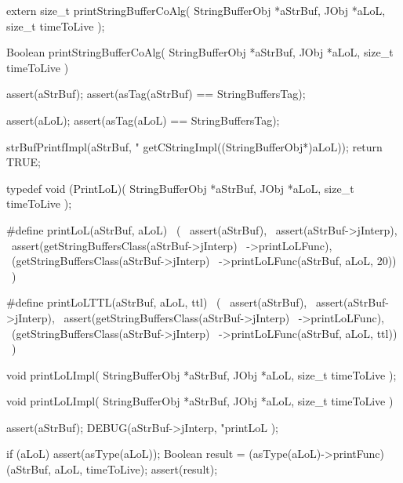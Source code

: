 
\startCHeader
extern size_t printStringBufferCoAlg(
  StringBufferObj *aStrBuf,
  JObj            *aLoL,
  size_t           timeToLive
);
\stopCHeader
{}

\startCCode
Boolean printStringBufferCoAlg(
  StringBufferObj *aStrBuf,
  JObj            *aLoL,
  size_t           timeToLive
) {
  assert(aStrBuf);
  assert(asTag(aStrBuf) == StringBuffersTag);
  
  assert(aLoL);
  assert(asTag(aLoL) == StringBuffersTag);

  strBufPrintfImpl(aStrBuf, "%
    getCStringImpl((StringBufferObj*)aLoL));
  return TRUE;
}
\stopCCode

\startCHeader
typedef void (PrintLoL)(
  StringBufferObj *aStrBuf,
  JObj            *aLoL,
  size_t           timeToLive
);

#define printLoL(aStrBuf, aLoL)                     \
  (                                                 \
    assert(aStrBuf),                                \
    assert(aStrBuf->jInterp),                       \
    assert(getStringBuffersClass(aStrBuf->jInterp)  \
      ->printLoLFunc),                              \
    (getStringBuffersClass(aStrBuf->jInterp)        \
      ->printLoLFunc(aStrBuf, aLoL, 20))            \
  )

#define printLoLTTL(aStrBuf, aLoL, ttl)             \
  (                                                 \
    assert(aStrBuf),                                \
    assert(aStrBuf->jInterp),                       \
    assert(getStringBuffersClass(aStrBuf->jInterp)  \
      ->printLoLFunc),                              \
    (getStringBuffersClass(aStrBuf->jInterp)        \
      ->printLoLFunc(aStrBuf, aLoL, ttl))           \
  )
\stopCHeader

\setCHeaderStream{private}
\startCHeader
void printLoLImpl(
  StringBufferObj *aStrBuf,
  JObj            *aLoL,
  size_t           timeToLive
);
\stopCHeader
\setCHeaderStream{public}

\startCCode
void printLoLImpl(
  StringBufferObj *aStrBuf,
  JObj            *aLoL,
  size_t           timeToLive
) {
  assert(aStrBuf);
  DEBUG(aStrBuf->jInterp,
    "printLoL %
  );

  if (aLoL) {
    assert(asType(aLoL));
    Boolean result =
      (asType(aLoL)->printFunc)
        (aStrBuf, aLoL, timeToLive);
    assert(result);
  }
}
\stopCCode
{}

